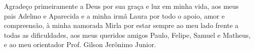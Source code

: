 Agradeço primeiramente a Deus por sua graça e luz em minha vida, aos meus pais Adelmo e Aparecida e a minha irmã Laura por todo o apoio, amor e compreensão, à minha namorada Mirla por estar sempre ao meu lado frente a todas as dificuldades, aos meus queridos amigos Paulo, Felipe, Samuel e Matheus, e ao meu orientador Prof. Gilson Jerônimo Junior.